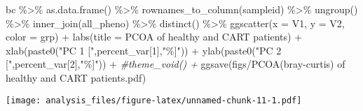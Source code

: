 \documentclass[
]{book}
\newenvironment{Shaded}{\begin{snugshade}}{\end{snugshade}}
\newcommand{\AttributeTok}[1]{\textcolor[rgb]{0.77,0.63,0.00}{#1}}
\newcommand{\CommentTok}[1]{\textcolor[rgb]{0.56,0.35,0.01}{\textit{#1}}}
\newcommand{\DecValTok}[1]{\textcolor[rgb]{0.00,0.00,0.81}{#1}}
\newcommand{\FunctionTok}[1]{\textcolor[rgb]{0.00,0.00,0.00}{#1}}
\newcommand{\NormalTok}[1]{#1}
\newcommand{\SpecialCharTok}[1]{\textcolor[rgb]{0.00,0.00,0.00}{#1}}
\newcommand{\StringTok}[1]{\textcolor[rgb]{0.31,0.60,0.02}{#1}}
\begin{document}
\begin{Shaded}
\begin{Highlighting}[]
\NormalTok{bc }\SpecialCharTok{\%\textgreater{}\%}
  \FunctionTok{as.data.frame}\NormalTok{() }\SpecialCharTok{\%\textgreater{}\%}
  \FunctionTok{rownames\_to\_column}\NormalTok{(}\StringTok{\textquotesingle{}sampleid\textquotesingle{}}\NormalTok{) }\SpecialCharTok{\%\textgreater{}\%} 
  \FunctionTok{ungroup}\NormalTok{() }\SpecialCharTok{\%\textgreater{}\%} 
  \FunctionTok{inner\_join}\NormalTok{(all\_pheno) }\SpecialCharTok{\%\textgreater{}\%} 
  \FunctionTok{distinct}\NormalTok{() }\SpecialCharTok{\%\textgreater{}\%} 
  \FunctionTok{ggscatter}\NormalTok{(}\AttributeTok{x =} \StringTok{\textquotesingle{}V1\textquotesingle{}}\NormalTok{, }\AttributeTok{y =} \StringTok{\textquotesingle{}V2\textquotesingle{}}\NormalTok{, }\AttributeTok{color =}  \StringTok{\textquotesingle{}grp\textquotesingle{}}\NormalTok{) }\SpecialCharTok{+}
  \FunctionTok{labs}\NormalTok{(}\AttributeTok{title =} \StringTok{\textquotesingle{}PCOA of healthy and CART patients\textquotesingle{}}\NormalTok{) }\SpecialCharTok{+}
  \FunctionTok{xlab}\NormalTok{(}\FunctionTok{paste0}\NormalTok{(}\StringTok{"PC 1 ["}\NormalTok{,percent\_var[}\DecValTok{1}\NormalTok{],}\StringTok{"\%]"}\NormalTok{)) }\SpecialCharTok{+}
  \FunctionTok{ylab}\NormalTok{(}\FunctionTok{paste0}\NormalTok{(}\StringTok{"PC 2 ["}\NormalTok{,percent\_var[}\DecValTok{2}\NormalTok{],}\StringTok{"\%]"}\NormalTok{)) }\SpecialCharTok{+}
  \CommentTok{\#theme\_void() +}
  \FunctionTok{ggsave}\NormalTok{(}\StringTok{\textquotesingle{}figs/PCOA(bray{-}curtis) of healthy and CART patients.pdf\textquotesingle{}}\NormalTok{)}
\end{Highlighting}
\end{Shaded}

\texttt{[image: analysis\_files/figure-latex/unnamed-chunk-11-1.pdf]}
\end{document}
